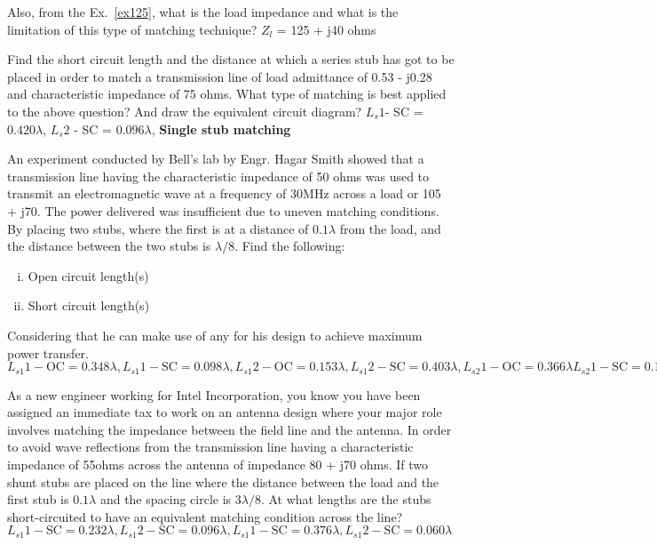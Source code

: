 \begin{mdframed}[ backgroundcolor=lightblue, linewidth=1pt, hidealllines=true]
\begin{ExerciseList}
\Exercise[label={ex126}] 
Also, from the Ex.~\ref{ex125}, what is the load impedance and what is the limitation of this type of matching technique?
\Answer[ref={ex126}]
$Z_l$ = 125 + j40 ohms

\Exercise[label={ex127}] 
Find the short circuit length and the distance at which a series stub has got to be placed in order to match a transmission line of load admittance of 0.53 - j0.28 and characteristic impedance of 75 ohms. What type of matching is best applied to the above question? And draw the equivalent circuit diagram?
\Answer[ref={ex128}]
$L_s1$- SC = $0.420\lambda$, $L_s2$ - SC = $0.096\lambda$, \textbf{Single stub matching}

\Exercise[label={ex129}] 
An experiment conducted by Bell's lab by Engr. Hagar Smith showed that a transmission line having the characteristic impedance of 50 ohms was used to transmit an electromagnetic wave at a frequency of 30MHz across a load or 105 + j70. The power delivered was insufficient due to uneven matching conditions. By placing two stubs, where the first is at a distance of $0.1\lambda$ from the load, and the distance between the two stubs is $\lambda/8$.
Find the following:
\begin{enumerate}[(i)]
\item Open circuit length(s)
\item Short circuit length(s)
\end{enumerate}
Considering that he can make use of any for his design to achieve maximum power transfer.
\Answer[ref={ex129}]
$L_{s1}{1} - \text{OC} = 0.348\lambda, L_{s1}{1} - \text{SC} = 0.098\lambda, L_{s1}{2} - \text{OC} = 0.153\lambda, L_{s1}{2} - \text{SC} = 0.403\lambda, L_{s2}{1} - \text{OC} = 0.366\lambda
L_{s2}{1} - \text{SC} = 0.116\lambda, L_{s2}{2} - \text{OC} = 0.200\lambda, L_{s2}{2} - \text{SC} = 0.450\lambda$


\Exercise[label={ex1310}] 
As a new engineer working for Intel Incorporation, you know you have been assigned an immediate tax to work on an antenna design where your major role involves matching the impedance between the field line and the antenna. In order to avoid wave reflections from the transmission line having a characteristic impedance of 55ohms across the antenna of impedance 80 + j70 ohms. If two shunt stubs are placed on the line where the distance between the load and the first stub is $0.1\lambda$ and the spacing circle is $3\lambda/8$. At what lengths are the stubs short-circuited to have an equivalent matching condition across the line?
\Answer[ref={ex1310}]
$L_{s1}{1} - \text{SC} = 0.232\lambda, L_{s1}{2} - \text{SC} = 0.096\lambda, L_{s1}{1} - \text{SC} = 0.376\lambda, L_{s1}{2} - \text{SC} = 0.060\lambda$
\end{ExerciseList}
\end{mdframed}
